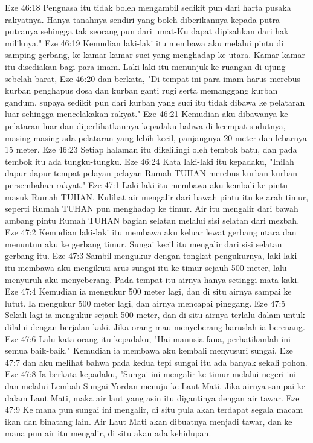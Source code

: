 Eze 46:18  Penguasa itu tidak boleh mengambil sedikit pun dari harta pusaka rakyatnya. Hanya tanahnya sendiri yang boleh diberikannya kepada putra-putranya sehingga tak seorang pun dari umat-Ku dapat dipisahkan dari hak miliknya."
Eze 46:19  Kemudian laki-laki itu membawa aku melalui pintu di samping gerbang, ke kamar-kamar suci yang menghadap ke utara. Kamar-kamar itu disediakan bagi para imam. Laki-laki itu menunjuk ke ruangan di ujung sebelah barat,
Eze 46:20  dan berkata, "Di tempat ini para imam harus merebus kurban penghapus dosa dan kurban ganti rugi serta memanggang kurban gandum, supaya sedikit pun dari kurban yang suci itu tidak dibawa ke pelataran luar sehingga mencelakakan rakyat."
Eze 46:21  Kemudian aku dibawanya ke pelataran luar dan diperlihatkannya kepadaku bahwa di keempat sudutnya, masing-masing ada pelataran yang lebih kecil, panjangnya 20 meter dan lebarnya 15 meter.
Eze 46:23  Setiap halaman itu dikelilingi oleh tembok batu, dan pada tembok itu ada tungku-tungku.
Eze 46:24  Kata laki-laki itu kepadaku, "Inilah dapur-dapur tempat pelayan-pelayan Rumah TUHAN merebus kurban-kurban persembahan rakyat."
Eze 47:1  Laki-laki itu membawa aku kembali ke pintu masuk Rumah TUHAN. Kulihat air mengalir dari bawah pintu itu ke arah timur, seperti Rumah TUHAN pun menghadap ke timur. Air itu mengalir dari bawah ambang pintu Rumah TUHAN bagian selatan melalui sisi selatan dari mezbah.
Eze 47:2  Kemudian laki-laki itu membawa aku keluar lewat gerbang utara dan menuntun aku ke gerbang timur. Sungai kecil itu mengalir dari sisi selatan gerbang itu.
Eze 47:3  Sambil mengukur dengan tongkat pengukurnya, laki-laki itu membawa aku mengikuti arus sungai itu ke timur sejauh 500 meter, lalu menyuruh aku menyeberang. Pada tempat itu airnya hanya setinggi mata kaki.
Eze 47:4  Kemudian ia mengukur 500 meter lagi, dan di situ airnya sampai ke lutut. Ia mengukur 500 meter lagi, dan airnya mencapai pinggang.
Eze 47:5  Sekali lagi ia mengukur sejauh 500 meter, dan di situ airnya terlalu dalam untuk dilalui dengan berjalan kaki. Jika orang mau menyeberang haruslah ia berenang.
Eze 47:6  Lalu kata orang itu kepadaku, "Hai manusia fana, perhatikanlah ini semua baik-baik." Kemudian ia membawa aku kembali menyusuri sungai,
Eze 47:7  dan aku melihat bahwa pada kedua tepi sungai itu ada banyak sekali pohon.
Eze 47:8  Ia berkata kepadaku, "Sungai ini mengalir ke timur melalui negeri ini dan melalui Lembah Sungai Yordan menuju ke Laut Mati. Jika airnya sampai ke dalam Laut Mati, maka air laut yang asin itu digantinya dengan air tawar.
Eze 47:9  Ke mana pun sungai ini mengalir, di situ pula akan terdapat segala macam ikan dan binatang lain. Air Laut Mati akan dibuatnya menjadi tawar, dan ke mana pun air itu mengalir, di situ akan ada kehidupan.
